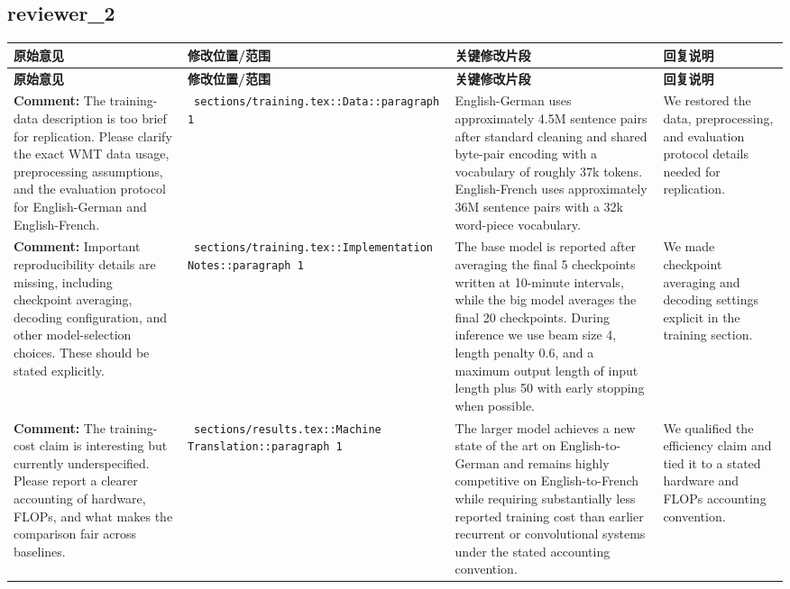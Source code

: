 \documentclass[11pt]{article}
\begin{document}
\subsection*{ reviewer_2 }
\begin{longtable}{|p{}|p{}|p{}|p{}|}
\hline
\textbf{原始意见} & \textbf{修改位置/范围} & \textbf{关键修改片段} & \textbf{回复说明} \\
\hline
\endfirsthead
\hline
\textbf{原始意见} & \textbf{修改位置/范围} & \textbf{关键修改片段} & \textbf{回复说明} \\
\hline
\endhead
\textbf{Comment:} The training-data description is too brief for replication. Please clarify the exact WMT data usage, preprocessing assumptions, and the evaluation protocol for English-German and English-French. & \texttt{ sections/training.tex::Data::paragraph 1 } & {\color{blue}\ttfamily English-German uses approximately 4.5M sentence pairs after standard cleaning and shared byte-pair encoding with a vocabulary of roughly 37k tokens. English-French uses approximately 36M sentence pairs with a 32k word-piece vocabulary.} & We restored the data, preprocessing, and evaluation protocol details needed for replication. \\
\hline
\textbf{Comment:} Important reproducibility details are missing, including checkpoint averaging, decoding configuration, and other model-selection choices. These should be stated explicitly. & \texttt{ sections/training.tex::Implementation Notes::paragraph 1 } & {\color{blue}\ttfamily The base model is reported after averaging the final 5 checkpoints written at 10-minute intervals, while the big model averages the final 20 checkpoints. During inference we use beam size 4, length penalty 0.6, and a maximum output length of input length plus 50 with early stopping when possible.} & We made checkpoint averaging and decoding settings explicit in the training section. \\
\hline
\textbf{Comment:} The training-cost claim is interesting but currently underspecified. Please report a clearer accounting of hardware, FLOPs, and what makes the comparison fair across baselines. & \texttt{ sections/results.tex::Machine Translation::paragraph 1 } & {\color{blue}\ttfamily The larger model achieves a new state of the art on English-to-German and remains highly competitive on English-to-French while requiring substantially less reported training cost than earlier recurrent or convolutional systems under the stated accounting convention.} & We qualified the efficiency claim and tied it to a stated hardware and FLOPs accounting convention. \\

\end{longtable}
\end{document}

